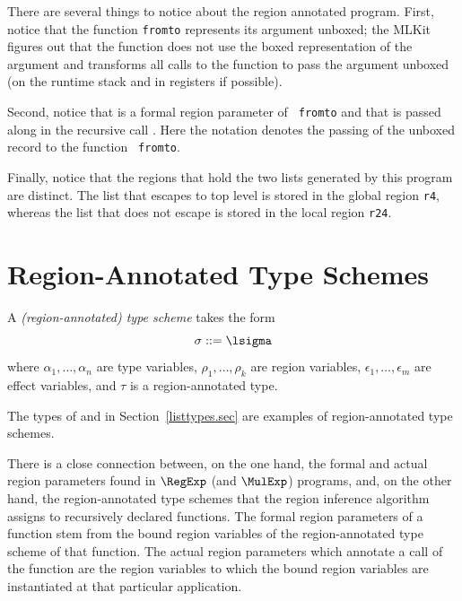 \documentclass[12pt]{book}
\begin{document}
There are several things to notice about the region annotated program.
First, notice that the function {\tt fromto} represents its argument
%
%
%
unboxed; the MLKit figures out that the function does not
use the boxed representation of the argument and transforms all calls
to the function to pass the argument unboxed (on the runtime stack and
in registers if possible).

Second, notice that  is a formal region parameter of {\tt
  fromto} and that  is passed along in the recursive call
. Here the notation 
denotes the passing of the unboxed record to the function {\tt
  fromto}.

%
Finally, notice that the regions that hold the two lists generated by
this program are distinct.  The list that escapes to top level is
stored in the global region {\tt r4}, whereas the list that does not
escape is stored in the local region {\tt r24}.

\section{Region-Annotated Type Schemes}
\label{regtych.sec}
A
%
%
{\em (region-annotated) type scheme\/} takes the form
$$\sigma::=\lsigma$$
where $\alpha_1,\ldots,\alpha_n$ are type variables,
$\rho_1,\ldots,\rho_k$ are region variables,
$\epsilon_1,\ldots,\epsilon_m$ are
%
effect variables, and $\tau$ is a region-annotated type.

The types of  and \boxml{::} in Section~\ref{listtypes.sec} are examples of
%
region-annotated type schemes.

There is a close connection between, on the one hand, the formal and
actual
%
region parameters found in $\RegExp$ (and $\MulExp$) programs, and, on
the other hand, the region-annotated type schemes that the region inference
algorithm assigns to recursively declared functions. The formal region
parameters of a function stem from the bound region variables of the
region-annotated type scheme of that function.  The actual region parameters
which annotate a call of the function are the region variables to
which the bound region variables are instantiated at that particular
application.
\end{document}
